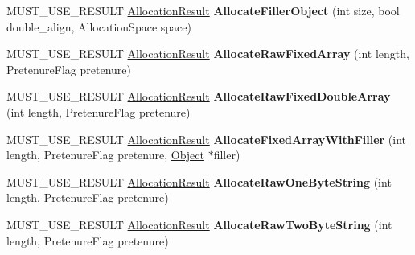 \begin{DoxyCompactItemize}
\item 
M\+U\+S\+T\+\_\+\+U\+S\+E\+\_\+\+R\+E\+S\+U\+LT \hyperlink{classv8_1_1internal_1_1_allocation_result}{Allocation\+Result} {\bfseries Allocate\+Filler\+Object} (int size, bool double\+\_\+align, Allocation\+Space space)\hypertarget{classv8_1_1internal_1_1_heap_ad038cc638a914bfeb54dbc376b568812}{}\label{classv8_1_1internal_1_1_heap_ad038cc638a914bfeb54dbc376b568812}

\item 
M\+U\+S\+T\+\_\+\+U\+S\+E\+\_\+\+R\+E\+S\+U\+LT \hyperlink{classv8_1_1internal_1_1_allocation_result}{Allocation\+Result} {\bfseries Allocate\+Raw\+Fixed\+Array} (int length, Pretenure\+Flag pretenure)\hypertarget{classv8_1_1internal_1_1_heap_abe2b8b5fe47c06f7ef3f95034fd90678}{}\label{classv8_1_1internal_1_1_heap_abe2b8b5fe47c06f7ef3f95034fd90678}

\item 
M\+U\+S\+T\+\_\+\+U\+S\+E\+\_\+\+R\+E\+S\+U\+LT \hyperlink{classv8_1_1internal_1_1_allocation_result}{Allocation\+Result} {\bfseries Allocate\+Raw\+Fixed\+Double\+Array} (int length, Pretenure\+Flag pretenure)\hypertarget{classv8_1_1internal_1_1_heap_a7347dbdafa59412a1b52500070e76967}{}\label{classv8_1_1internal_1_1_heap_a7347dbdafa59412a1b52500070e76967}

\item 
M\+U\+S\+T\+\_\+\+U\+S\+E\+\_\+\+R\+E\+S\+U\+LT \hyperlink{classv8_1_1internal_1_1_allocation_result}{Allocation\+Result} {\bfseries Allocate\+Fixed\+Array\+With\+Filler} (int length, Pretenure\+Flag pretenure, \hyperlink{classv8_1_1internal_1_1_object}{Object} $\ast$filler)\hypertarget{classv8_1_1internal_1_1_heap_ac053f048b35574cabc7f3749473b942e}{}\label{classv8_1_1internal_1_1_heap_ac053f048b35574cabc7f3749473b942e}

\item 
M\+U\+S\+T\+\_\+\+U\+S\+E\+\_\+\+R\+E\+S\+U\+LT \hyperlink{classv8_1_1internal_1_1_allocation_result}{Allocation\+Result} {\bfseries Allocate\+Raw\+One\+Byte\+String} (int length, Pretenure\+Flag pretenure)\hypertarget{classv8_1_1internal_1_1_heap_a04af24a1ba01a3a0de825f96f63d6ffd}{}\label{classv8_1_1internal_1_1_heap_a04af24a1ba01a3a0de825f96f63d6ffd}

\item 
M\+U\+S\+T\+\_\+\+U\+S\+E\+\_\+\+R\+E\+S\+U\+LT \hyperlink{classv8_1_1internal_1_1_allocation_result}{Allocation\+Result} {\bfseries Allocate\+Raw\+Two\+Byte\+String} (int length, Pretenure\+Flag pretenure)\hypertarget{classv8_1_1internal_1_1_heap_aafdf99ca025a04570d687b8a46f612d1}{}\label{classv8_1_1internal_1_1_heap_aafdf99ca025a04570d687b8a46f612d1}


\end{DoxyCompactItemize}
